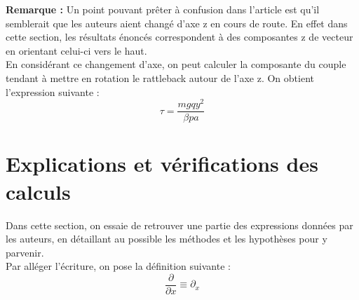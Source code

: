 \documentclass[12pt,a4paper]{article}
\begin{document}
	\textbf{Remarque :} Un point pouvant prêter à confusion dans l'article est qu'il semblerait que les auteurs aient changé d'axe z en cours de route. En effet dans cette section, les résultats énoncés correspondent à des composantes z de vecteur en orientant celui-ci vers le haut.\\
	
	En considérant ce changement d'axe, on peut calculer la composante du couple tendant à mettre en rotation le rattleback autour de l'axe z.
	On obtient l'expression suivante :
	$$\tau=\dfrac{mgqy^2}{\beta p a}$$
	
	
	
	\section{Explications et vérifications des calculs}
	\label{sec:calculs}
	Dans cette section, on essaie de retrouver une partie des expressions données par les auteurs, en détaillant au possible les méthodes et les hypothèses pour y parvenir.\\
	Par alléger l'écriture, on pose la définition suivante :
	$$\dfrac{\partial}{\partial x}\equiv\partial_x$$ 
\end{document}
